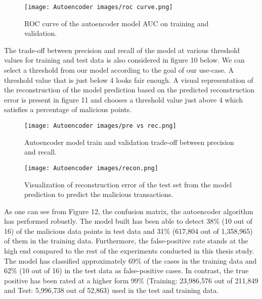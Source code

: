 \documentclass[journal]{IEEEtran}
\begin{document}
\begin{figure}[h!] %
    \centering
    \texttt{[image: Autoencoder images/roc curve.png]}  %
    \caption{ROC curve of the autoencoder model AUC on training and validation.}
    \label{fig:autoencoder-structure}
\end{figure}

The trade-off between precision and recall of the model at various threshold values for training and test data is also considered in figure 10 below. We can select a threshold from our model according to the goal of our use-case. A threshold value that is just below 4 looks fair enough. A visual representation of the reconstruction of the model prediction based on the predicted reconstruction error is present in figure 11 and chooses a threshold value just above 4 which satisfies a percentage of malicious points.

\begin{figure}[h!] %
    \centering
    \texttt{[image: Autoencoder images/pre vs rec.png]}  %
    \caption{Autoencoder model train and validation trade-off between precision and recall.}
    \label{fig:autoencoder-structure}
\end{figure}

\begin{figure}[h!] %
    \centering
    \texttt{[image: Autoencoder images/recon.png]}  %
    \caption{Visualization of reconstruction error of the test set from the model prediction to predict the malicious transactions.}
    \label{fig:autoencoder-structure}
\end{figure}

As one can see from Figure 12, the confusion matrix, the autoencoder algorithm has performed robustly. The model built has been able to detect 38\% (10 out of 16) of the malicious data points in test data and 31\% (617,804 out of 1,358,965) of them in the training data. Furthermore, the false-positive rate stands at the high end compared to the rest of the experiments conducted in this thesis study. The model has classified approximately 69\% of the cases in the training data and 62\% (10 out of 16) in the test data as false-positive cases. In contrast, the true positive has been rated at a higher form 99\% (Training: 23,986,576 out of 211,849 and Test: 5,996,738 out of 52,863) used in the test and training data.
\end{document}
